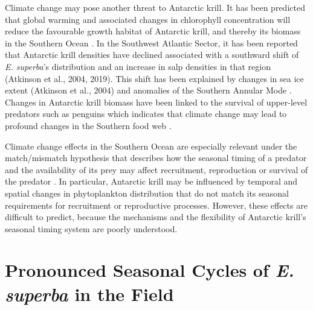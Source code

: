 Climate change may pose another threat to Antarctic krill. It has been
predicted that global warming and associated changes in chlorophyll
concentration will reduce the favourable growth habitat of Antarctic krill, and
thereby its biomass in the Southern Ocean \citep{hill_potential_2013}. In the Southwest
Atlantic Sector, it has been reported that Antarctic krill densities have
declined associated with a southward shift of \textit{E. superba}'s
distribution and an increase in salp densities in that region \citep{atkinson_krill_2019}(Atkinson et al.,
2004, 2019). This shift has been explained by changes in sea ice extent
(Atkinson et al., 2004) and anomalies of the Southern Annular Mode \citep{atkinson_krill_2019}. Changes in Antarctic krill biomass have been linked to the survival
of upper-level predators such as penguins which indicates that climate change
may lead to profound changes in the Southern food web \citep{trivelpiece_variability_2011}.

Climate change effects in the Southern Ocean are especially relevant under the
match/mismatch hypothesis that describes how the seasonal timing of a predator
and the availability of its prey may affect recruitment, reproduction or
survival of the predator \citep{durant_climate_2007}. In particular, Antarctic krill
may be influenced by temporal and spatial changes in phytoplankton distribution
that do not match its seasonal requirements for recruitment or reproductive
processes. However, these effects are difficult to predict, because the
mechanisms and the flexibility of Antarctic krill's seasonal timing system are
poorly understood.

\section{Pronounced Seasonal Cycles of \textit{E. superba} in the Field}


